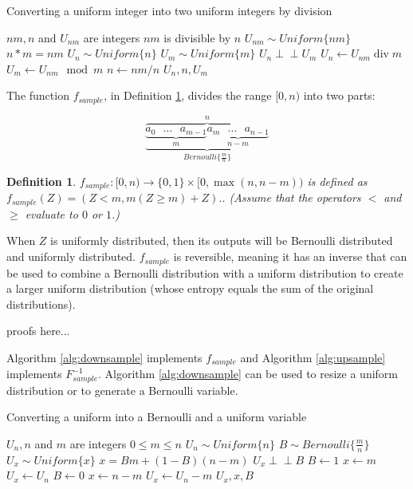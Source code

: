 \documentclass[12pt]{article}
\newtheorem{definition}{Definition}
\newcommand{\indep}{\perp\!\!\!\perp}
\begin{document}
\begin{algorithm}
\caption{Converting a uniform integer into two uniform integers by division}
\label{alg:divide-uniform}
\begin{algorithmic}[1]
    \Require $nm, n$ and $U_{nm}$ are integers
    \Require $nm$ is divisible by $n$
    \Require $U_{nm} \sim Uniform\{nm\}$
    \Ensure $n * m = nm$
    \Ensure $U_{n} \sim Uniform\{n\}$
    \Ensure $U_{m} \sim Uniform\{m\}$
    \Ensure $U_n \indep U_m$
  \State $U_n \gets U_{nm} \operatorname{div} m$
  \State $U_m \gets U_{nm} \mod m$
  \State $n \gets nm / n$
  \State \Return $U_n, n, U_m$
\EndProcedure
\end{algorithmic}
\end{algorithm}


The function $f_{sample}$, in Definition \ref{def:sample}, divides the range $[0,n)$ into two parts:

\[
\overbrace{
    \underbrace{
        \underbrace{a_0 \text{   } ... \text{   } a_{m-1}}_{m}
        \underbrace{a_m \text{   } ... \text{   } a_{n-1}}_{n-m}}
    }_{Bernoulli\{\frac{m}{n}\}}^{n}
\]

\begin{definition}
$f_{sample}: [0,n) \rightarrow \{0,1\} \times [0,\max(n,n-m))$ is defined as $f_{sample}(Z) = (Z<m, m(Z\ge m) + Z).$. (Assume that the operators $<$ and $\ge$ evaluate to $0$ or $1$.)
\label{def:sample}
\end{definition}

When $Z$ is uniformly distributed, then its outputs will be Bernoulli distributed and uniformly distributed. $f_{sample}$ is reversible, meaning it has an inverse that can be used to combine a Bernoulli distribution with a uniform distribution to create a larger uniform distribution (whose entropy equals the sum of the original distributions).

proofs here...

Algorithm \ref{alg:downsample} implements $f_{sample}$ and Algorithm \ref{alg:upsample} implements $F^{-1}_{sample}$. Algorithm \ref{alg:downsample} can be used to resize a uniform distribution or to generate a Bernoulli variable.


\begin{algorithm}
\caption{Converting a uniform into a Bernoulli and a uniform variable}
\label{alg:downsample}
\begin{algorithmic}[1]
    \Require $U_n, n$ and $m$ are integers 
    \Require $0 \le m \le n$
    \Require $U_n \sim Uniform \{n\}$
    \Ensure $B \sim Bernoulli\{\frac{m}{n}\}$
    \Ensure $U_x \sim Uniform\{x\}$
    \Ensure $x = Bm + (1-B)(n-m)$
    \Ensure $U_x \indep B$
    \State $B \gets 1$  
    \State $x \gets m$
    \State $U_x \gets U_n$
  \Else
    \State $B \gets 0$  
    \State $x \gets n-m$
    \State $U_x \gets U_n-m$
  \EndIf
  \State \Return $U_x, x, B$
\EndProcedure
\end{algorithmic}
\end{algorithm}
\end{document}

